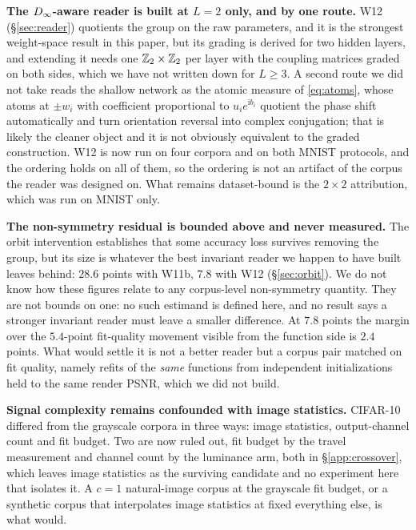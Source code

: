 \textbf{The $D_\infty$-aware reader is built at $L=2$ only, and by one route.} W12
(\S\ref{sec:reader}) quotients the group on the raw parameters, and it is the strongest weight-space result in this paper, but its grading is derived for two hidden layers, and extending it needs
one $\mathbb{Z}_2\times\mathbb{Z}_2$ per layer with the coupling matrices graded on both sides, which we have not
written down for $L\ge3$. A second route we did not take reads the shallow network as the atomic
measure of \eqref{eq:atoms}, whose atoms at $\pm w_i$ with coefficient proportional to
$u_i e^{\mathrm i b_i}$ quotient the phase shift automatically and turn orientation reversal into
complex conjugation; that is likely the cleaner object and it is not obviously equivalent to the
graded construction. W12 is now run on four corpora and on both MNIST protocols, and the ordering
holds on all of them, so the ordering is not an artifact of the corpus the reader was designed on. What remains dataset-bound is the $2\times2$ attribution, which was run on MNIST only.

\textbf{The non-symmetry residual is bounded above and never measured.} The orbit intervention
establishes that some accuracy loss survives removing the group, but its size is whatever the best
invariant reader we happen to have built leaves behind: $28.6$ points with W11b, $7.8$ with W12
(\S\ref{sec:orbit}). We do not know how these figures relate to any corpus-level non-symmetry
quantity. They are not bounds on one: no such estimand is defined here, and no result says a
stronger invariant reader must leave a smaller difference. At $7.8$ points the margin over the
$5.4$-point fit-quality movement visible from the function side is $2.4$ points. What would settle
it is not a better reader but a corpus pair matched on fit quality, namely refits of the \emph{same} functions from independent initializations held to the same render PSNR, which we did not build.

\textbf{Signal complexity remains confounded with image statistics.} CIFAR-10 differed from the
grayscale corpora in three ways: image statistics, output-channel count and fit budget. Two are now ruled out, fit budget by the travel measurement and channel count by the luminance arm, both in \S\ref{app:crossover}, which leaves image statistics as the surviving candidate and no
experiment here that isolates it. A $c=1$ natural-image corpus at the grayscale fit budget, or a
synthetic corpus that interpolates image statistics at fixed everything else, is what would.


